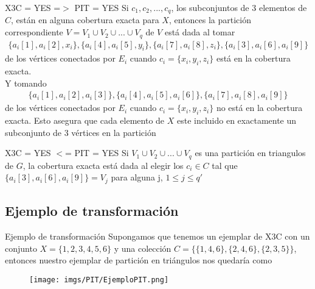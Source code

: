 \begin{frame}{X3C = YES =$>$ PIT = YES}
    Si $c_1,c_2,...,c_q$, los subconjuntos de 3 elementos de $C$, están en alguna cobertura exacta para $X$, entonces la partición correspondiente $V=V_1 \cup V_2 \cup ... \cup V_q$ de $V$ está dada al tomar
    \begin{align*}
        \{a_i[1],a_i[2],x_i\},\{a_i[4],a_i[5],y_i\},\{a_i[7],a_i[8],z_i\}, \{a_i[3],a_i[6],a_i[9]\}
    \end{align*}
    de los vértices conectados por $E_i$ cuando $c_i=\{x_i,y_i,z_i\}$ está en la cobertura exacta.\\

    \vspace{10pt}
    Y tomando
    \begin{align*}
        \{a_i[1],a_i[2],a_i[3]\},\{a_i[4],a_i[5],a_i[6]\},\{a_i[7],a_i[8],a_i[9]\}
    \end{align*}
    de los vértices conectados por $E_i$ cuando $c_i=\{x_i,y_i,z_i\}$ no está en la cobertura exacta. Esto asegura que cada elemento de $X$ este incluido en exactamente un subconjunto de 3 vértices en la partición\\
\end{frame}

\begin{frame}{X3C = YES $<$= PIT = YES}
    Si $V_1\cup V_2 \cup ... \cup V_q$ es una partición en triangulos de $G$, la cobertura exacta está dada al elegir los $c_i\in C$ tal que $\{a_i[3],a_i[6],a_i[9]\}=V_j$ para alguna j, $1\leqslant j \leqslant q'$
\end{frame}

\renewcommand{\subsectiontitle}{Ejemplo de transformación}
\subsection{\subsectiontitle}

\begin{frame}{\subsectiontitle}
    Supongamos que tenemos un ejemplar de X3C con un conjunto $X=\{1,2,3,4,5,6\}$ y una colección $C=\{\{1,4,6\},\{2,4,6\},\{2,3,5\}\}$, entonces nuestro ejemplar de partición en triángulos nos quedaría como
\end{frame}
\begin{frame}
    \begin{figure}
    \centering
        \texttt{[image: imgs/PIT/EjemploPIT.png]}
    \end{figure}
\end{frame}